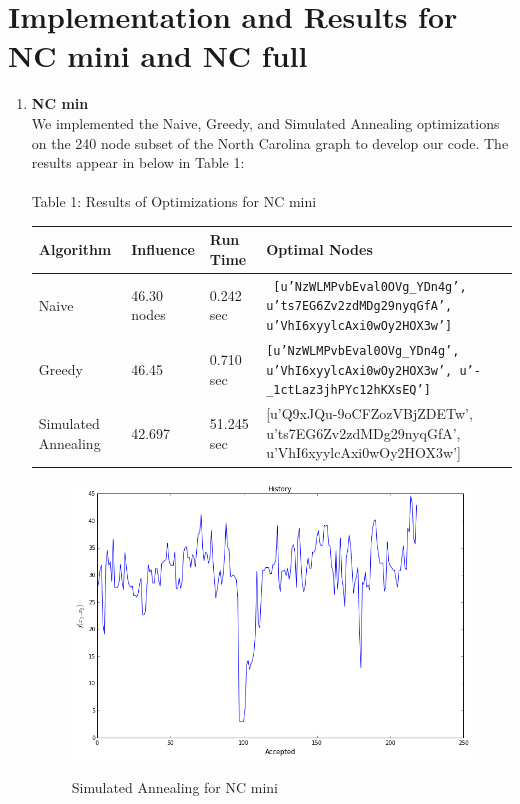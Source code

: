 \documentclass[11pt]{scrartcl} %
\begin{document}
\section{Implementation and Results for NC mini and NC full}
\begin{enumerate}
\item \textbf{NC min}\\
We implemented the Naive, Greedy, and Simulated Annealing optimizations on the 240 node subset of the North Carolina graph to develop our code.  The results appear in below in Table 1:\\
\\

Table 1: Results of Optimizations for NC mini

\begin{center}
\begin{tabular}{ | l | l | l | p{8cm} |}
\hline
Algorithm & Influence & Run Time & Optimal Nodes \\ \hline
Naive & 46.30 nodes & 0.242 sec & \texttt{ [u'NzWLMPvbEval0OVg\_YDn4g', u'ts7EG6Zv2zdMDg29nyqGfA',
 u'VhI6xyylcAxi0wOy2HOX3w'] }\\ \hline
Greedy & 46.45 & 0.710 sec & \texttt{[u'NzWLMPvbEval0OVg\_YDn4g', u'VhI6xyylcAxi0wOy2HOX3w', u'-\_1ctLaz3jhPYc12hKXsEQ']} \\ \hline
Simulated Annealing & 42.697 & 51.245 sec & [u'Q9xJQu-9oCFZozVBjZDETw', u'ts7EG6Zv2zdMDg29nyqGfA', u'VhI6xyylcAxi0wOy2HOX3w'] \\ \hline
\end{tabular}
\end{center}


\begin{figure}
\centering
\includegraphics[width=10 cm]{SimAnMini}
\label{fig_sim}
\caption{Simulated Annealing for NC mini}
\label{fig:LR}
\end{figure}


\end{enumerate}
\end{document}
